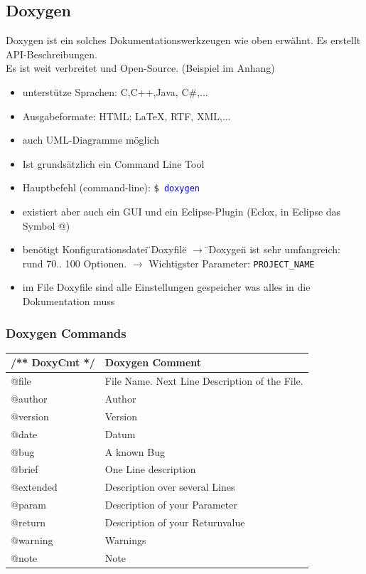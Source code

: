 \subsection{Doxygen}
Doxygen ist ein solches Dokumentationswerkzeugen wie oben erwähnt. Es erstellt API-Beschreibungen.\\
Es ist weit verbreitet und Open-Source. (Beispiel im Anhang)
\begin{itemize}
	\item unterstütze Sprachen: C,C++,Java, C\#,...
	\item Ausgabeformate: HTML; LaTeX, RTF, XML,...
	\item auch UML-Diagramme möglich
	\item Ist grundsätzlich ein Command Line Tool
	\item Hauptbefehl (command-line): \texttt{\$ \textcolor{blue}{doxygen}}
	\item existiert aber auch ein GUI und ein Eclipse-Plugin (Eclox, in Eclipse das Symbol @)
	\item benötigt Konfigurationsdatei \"{}Doxyfile\"{} \newline
	 $\rightarrow$ \"{}Doxygen\"{} ist sehr umfangreich: rund 70.. 100 Optionen. \newline $\rightarrow$ Wichtigster Parameter: \texttt{PROJECT\_NAME} 
	\item im File Doxyfile sind alle Einstellungen gespeicher was alles in die Dokumentation muss
\end{itemize}
    \renewcommand{\arraystretch}{1.3}
    \begin{minipage}{0.5\linewidth}
        \subsubsection{Doxygen Commands}
        \begin{tabular}{|l|l|}
        	\hline	/** DoxyCmt */  &  Doxygen Comment\\ 
        	\hline	@file	      	& File Name. Next Line Description of the File.\\
        	\hline	@author 	    & Author\\
        	\hline	@version	    & Version \\
        	\hline   @date		    & Datum   \\ 
        	\hline   @bug    		& A known Bug \\
        	\hline   @brief	    	& One Line description  \\
        	\hline   @extended	    & Description over several Lines  \\
        	\hline   @param	       	& Description of your Parameter  \\
        	\hline   @return	    & Description of your Returnvalue     \\ 
        	\hline   @warning	    & Warnings \\ 
        	\hline   @note		    & Note\\ 
        	\hline        
        \end{tabular}
    \end{minipage}
